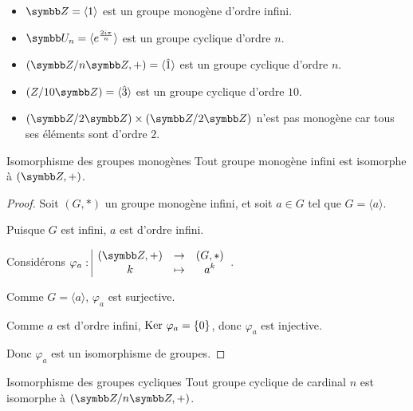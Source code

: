 \begin{exemple}
    \begin{itemize}
        \item $\Z = \langle 1 \rangle$ est un groupe monogène d'ordre infini.
        \item $\U_n = \langle e^{\frac{2i\pi} n} \rangle$ est un groupe cyclique d'ordre $n$.
        \item $(\Z/n\Z, +) = \langle \hat 1 \rangle$ est un groupe cyclique d'ordre $n$.
        \item $(Z / 10 \Z) = \langle \hat 3 \rangle$ est un groupe cyclique d'ordre $10$.
        \item $(\Z / 2 \Z) \times (\Z / 2 \Z)$ n'est pas monogène car tous ses éléments sont d'ordre $2$. 
    \end{itemize}
\end{exemple}

\begin{theoreme}{Isomorphisme des groupes monogènes}{}
    Tout groupe monogène infini est isomorphe à $(\Z, +)$.
\end{theoreme}


\begin{proof}
    Soit $(G, \ast)$ un groupe monogène infini, et soit $a \in G$ tel que $G = \langle a \rangle$.

    Puisque $G$ est infini, $a$ est d'ordre infini.

    Considérons $\fonction{\varphi_a}{(\Z, +)}{(G, \ast)}{k}{a^k}$.

    Comme $G = \langle a \rangle$, $\varphi_a$ est surjective.

    Comme $a$ est d'ordre infini, $\operatorname{Ker} \, \varphi_a = \{0\}$, donc $\varphi_a$ est injective.

    Donc $\varphi_a$ est un isomorphisme de groupes.
\end{proof}

\begin{theoreme}{Isomorphisme des groupes cycliques}{}
    Tout groupe cyclique de cardinal $n$ est isomorphe à $(\Z/n\Z, +)$.
\end{theoreme}


